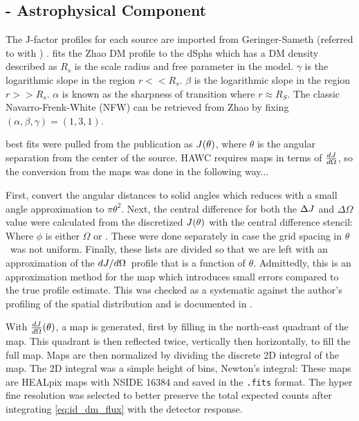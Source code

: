 \subsection{\J - Astrophysical Component}\label{sec:gd_spatialmodel}

The J-factor profiles for each source are imported from Geringer-Sameth (referred to with \GS) \cite{Geringer_Sameth_2015}.
\GS fits the Zhao DM profile to the dSphs which has a DM density described as \cite{Zhao:1995cp}
\zhaoProfile
$R_s$ is the scale radius and free parameter in the model.
$\gamma$ is the logarithmic slope in the region $r << R_s$.
$\beta$ is the logarithmic slope in the region $r >> R_s$.
$\alpha$ is known as the sharpness of transition where $r \approx R_S$.
The classic Navarro-Frenk-White \cite{NFWProfile} (NFW) can be retrieved from Zhao by fixing $(\alpha, \beta, \gamma) = (1,3,1)$.

\GS best fits were pulled from the publication as $J(\theta)$, where $\theta$ is the angular separation from the center of the source.
HAWC requires maps in terms of $\frac{dJ}{d\Omega}$, so the conversion from the maps was done in the following way...

First, convert the angular distances to solid angles
\angleTOsolidangle
which reduces with a small angle approximation to $\pi \theta^2$.
Next, the central difference for both the $\Delta J$ and $\Delta \Omega$ value were calculated from the discretized $J(\theta)$ with the central difference stencil:
\centerDiff
Where $\phi$ is either $\Omega$ or \J.
These were done separately in case the grid spacing in $\theta$~was not uniform.
Finally, these lists are divided so that we are left with an approximation of the $dJ/d\Omega$~profile that is a function of $\theta$.
Admittedly, this is an approximation method for the map which introduces small errors compared to the true profile estimate.
This was checked as a systematic against the author's profiling of the spatial distribution and is documented in .

With $\frac{dJ}{d\Omega}(\theta)$, a map is generated, first by filling in the north-east quadrant of the map.
This quadrant is then reflected twice, vertically then horizontally, to fill the full map.
Maps are then normalized by dividing the discrete 2D integral of the map.
The 2D integral was a simple height of bins, Newton's integral:
\newtonIntegral
These maps are HEALpix maps with NSIDE 16384 and saved in the \texttt{.fits} format.
The hyper fine resolution was selected to better preserve the total expected counts after integrating \cref{eq:id_dm_flux} with the detector response.

